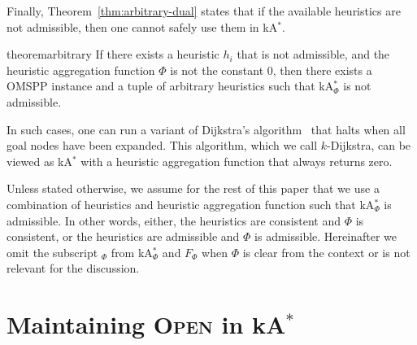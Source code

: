 \documentclass[smallextended]{svjour3}       %
\newcommand{\kD}{$k$-Dijkstra\xspace}
\newcommand{\omspp}{\ac{OMSPP}\xspace}
\newcommand{\kastar}{kA$^*$\xspace}
\newcommand{\kastarphi}{\textup{kA}$^*_{\Phi}$\xspace}
\newcommand{\open}{\textsc{Open}\xspace}
\newcommand{\axiomadm}{admissible\xspace}
\newcommand{\axiomcons}{consistent\xspace}
\newcommand{\roni}[1]{\textbf{[RS:#1]}}
\begin{document}

Finally, Theorem~\ref{thm:arbitrary-dual} states that if the available  heuristics are not admissible, then one cannot safely use them in \kastar. 
\begin{restatable}{theorem}{arbitrary}
  \label{thm:arbitrary-dual}
  If there exists a heuristic $h_i$ that is not admissible, and the heuristic aggregation function $\Phi$ is not the constant 0, then there exists a \omspp instance and a tuple of arbitrary heuristics such that \kastarphi is not admissible.
\end{restatable}
In such cases, one can run a variant of Dijkstra's algorithm~\cite{DIJ59}
that halts when all goal nodes have been expanded. This algorithm, which we call \kD, can be viewed as \kastar with a heuristic aggregation function that always returns zero. 






Unless stated otherwise, we assume for the rest of this paper that we use a combination of heuristics and heuristic aggregation function such that \kastarphi is admissible. In other words, either, the heuristics are consistent and $\Phi$ is \axiomcons, or the heuristics are admissible and $\Phi$ is \axiomadm.
Hereinafter we omit the subscript $_\Phi$ from \kastarphi and $F_\Phi$ when $\Phi$ is clear from the context or is not relevant for the discussion. 






\section{Maintaining \open in \kastar}
\label{sec:lazy}



\end{document}
